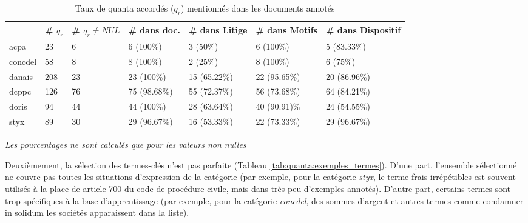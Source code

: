 \begin{table}[!htb]
	\scriptsize \centering
	\begin{tabular}{|l|l|l|l|l|l|l|}
		\hline
		& \textbf{\# $q_r$} & \textbf{\# $q_r\neq NUL$} & \textbf{\# dans doc.} & \textbf{\# dans Litige} & \textbf{\# dans Motifs} & \textbf{\# dans Dispositif} \\ \hline
		acpa               & 23                & 6                       & 6 (100\%)             & 3 (50\%)                & 6 (100\%)               & 5 (83.33\%)                 \\ \hline
		concdel            & 58                & 8                       & 8 (100\%)             & 2 (25\%)                & 8 (100\%)               & 6 (75\%)                    \\ \hline
		danais             & 208               & 23                      & 23 (100\%)            & 15 (65.22\%)            & 22 (95.65\%)            & 20 (86.96\%)                \\ \hline
		dcppc              & 126               & 76                      & 75 (98.68\%)          & 55 (72.37\%)            & 56 (73.68\%)            & 64 (84.21\%)                \\ \hline
		doris              & 94                & 44                      & 44 (100\%)            & 28 (63.64\%)            & 40 (90.91)\%            & 24 (54.55\%)                \\ \hline
		styx               & 89                & 30                      & 29 (96.67\%)          & 16 (53.33\%)            & 22 (73.33\%)            & 29 (96.67\%)                \\ \hline
	\end{tabular}

	\textit{Les pourcentages ne sont calculés que pour les valeurs non nulles}
	\caption{Taux de quanta accordés ($q_r$) mentionnés dans les documents annotés} \label{tab:quanta:mentionQr}
\end{table}

Deuxièmement, la sélection des termes-clés n'est pas parfaite (Tableau \ref{tab:quanta:exemples_termes}). D'une part, l'ensemble sélectionné ne couvre  pas toutes les situations d'expression de la catégorie (par exemple, pour la catégorie \textit{styx}, le terme \og frais irrépétibles\fg{} est souvent utilisés à la place de \og article 700 du code de procédure civile\fg{}, mais dans très peu d'exemples annotés). D'autre part, certains termes sont trop spécifiques à la base d'apprentissage (par exemple, pour la catégorie \textit{concdel}, des sommes d'argent et autres termes comme \og condamner in solidum les sociétés \fg{} apparaissent dans la liste).

